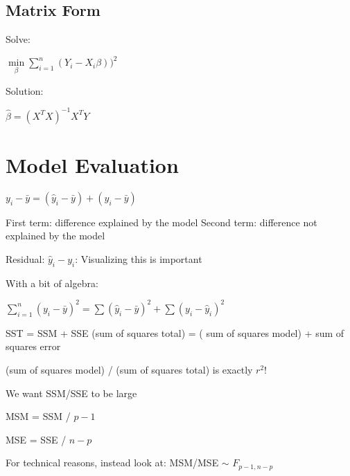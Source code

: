 \documentclass[twoside]{article}
\def\beginrefs{\begin{list}%
        {[\arabic{equation}]}{\usecounter{equation}
         \setlength{\leftmargin}{2.0truecm}\setlength{\labelsep}{0.4truecm}%
         \setlength{\labelwidth}{1.6truecm}}}
\def\endrefs{\end{list}}
\def\bibentry#1{\item[\hbox{[#1]}]}
\begin{document}
\subsection{Matrix Form}

Solve:

$\min\limits_{\beta} \sum\limits_{i=1}^n (Y_i - X_i\beta))^2$

Solution:

$\hat{\beta} = (X^TX)^{-1}X^TY$

\section{Model Evaluation}

$y_i - \bar{y} = (\hat{y}_i - \bar{y}) + (y_i-\bar{y})$

First term: difference explained by the model
Second term: difference not explained by the model

Residual: $\hat{y}_i - y_i$: Visualizing this is important

With a bit of algebra:

$\sum\limits_{i=1}^n (y_i-\bar{y})^2 = \sum (\hat{y}_i - \bar{y})^2 + \sum(y_i - \hat{y}_i)^2$

SST = SSM + SSE
(sum of squares total) = ( sum of squares model) + sum of squares error

(sum of squares model) / (sum of squares total) is exactly $r^2$!

We want SSM/SSE to be large

MSM = SSM / $p-1$

MSE = SSE / $n-p$

For technical reasons, instead look at: MSM/MSE $\sim$ $F_{p-1,n-p}$


\end{document}
